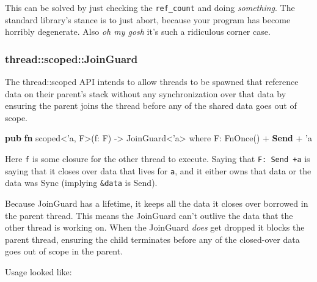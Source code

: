 \documentclass[a4paper,]{book}
\newenvironment{Shaded}{\begin{snugshade}}{\end{snugshade}}
\newcommand{\KeywordTok}[1]{\textcolor[rgb]{0.13,0.29,0.53}{\textbf{{#1}}}}
\newcommand{\OtherTok}[1]{\textcolor[rgb]{0.56,0.35,0.01}{{#1}}}
\newcommand{\NormalTok}[1]{{#1}}
\begin{document}
This can be solved by just checking the \texttt{ref\_count} and doing
\emph{something}. The standard library's stance is to just abort,
because your program has become horribly degenerate. Also \emph{oh my
gosh} it's such a ridiculous corner case.

\subsubsection{thread::scoped::JoinGuard}\label{threadscopedjoinguard}

The thread::scoped API intends to allow threads to be spawned that
reference data on their parent's stack without any synchronization over
that data by ensuring the parent joins the thread before any of the
shared data goes out of scope.

\begin{Shaded}
\begin{Highlighting}[]
\KeywordTok{pub} \KeywordTok{fn} \NormalTok{scoped<}\OtherTok{'a}\NormalTok{, F>(f: F) -> JoinGuard<}\OtherTok{'a}\NormalTok{>}
    \NormalTok{where F: FnOnce() + }\KeywordTok{Send} \NormalTok{+ }\OtherTok{'a}
\end{Highlighting}
\end{Shaded}

Here \texttt{f} is some closure for the other thread to execute. Saying
that \texttt{F:\ Send\ +\textquotesingle{}a} is saying that it closes
over data that lives for \texttt{\textquotesingle{}a}, and it either
owns that data or the data was Sync (implying \texttt{\&data} is Send).

Because JoinGuard has a lifetime, it keeps all the data it closes over
borrowed in the parent thread. This means the JoinGuard can't outlive
the data that the other thread is working on. When the JoinGuard
\emph{does} get dropped it blocks the parent thread, ensuring the child
terminates before any of the closed-over data goes out of scope in the
parent.

Usage looked like:
\end{document}

